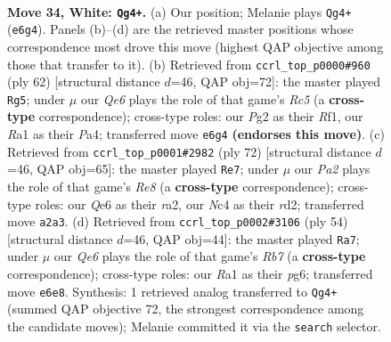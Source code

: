 \documentclass[11pt]{article}
\begin{document}
\clearpage

\begin{figure}[p]\centering
\begin{subfigure}{0.46\textwidth}\centering
\resizebox{\linewidth}{!}{%
\newchessgame
\chessboard[
  setfen={5r2/1r4kp/1p2Q3/p7/2N4P/8/PP3PP1/R5K1 w - - 5 34},
  showmover=false,
  pgfstyle=straightmove, color=movearrow, markmove={e6-g4}
]}
\caption{}
\end{subfigure}\hfill
\begin{subfigure}{0.46\textwidth}\centering
\resizebox{\linewidth}{!}{%
\newchessgame
\chessboard[
  setfen={4r2k/p6p/2N3b1/p1R5/P7/5PK1/3r3P/5R2 w - - 5 32},
  showmover=false,
  pgfstyle=straightmove, color=movearrow, markmove={c5-g5}
]}
\caption{}
\end{subfigure}
\\[4pt]
\begin{subfigure}{0.46\textwidth}\centering
\resizebox{\linewidth}{!}{%
\newchessgame
\chessboard[
  setfen={4R3/5ppk/7p/2n2N2/8/7P/r2r1PP1/5RK1 w - - 7 37},
  showmover=false,
  pgfstyle=straightmove, color=movearrow, markmove={e8-e7}
]}
\caption{}
\end{subfigure}\hfill
\begin{subfigure}{0.46\textwidth}\centering
\resizebox{\linewidth}{!}{%
\newchessgame
\chessboard[
  setfen={3r1k2/1R3p1p/6p1/1N6/1n1P4/p7/P4PPP/6K1 w - - 0 28},
  showmover=false,
  pgfstyle=straightmove, color=movearrow, markmove={b7-a7}
]}
\caption{}
\end{subfigure}
\caption{\textbf{Move 34, White: \texttt{Qg4+}.} (a) Our position; Melanie plays \texttt{Qg4+} (\texttt{e6g4}). Panels (b)--(d) are the retrieved master positions whose correspondence most drove this move (highest QAP objective among those that transfer to it). (b) Retrieved from \texttt{ccrl\_top\_p0000\#960} (ply 62) [structural distance $d$=46, QAP obj=72]: the master played \texttt{Rg5}; under $\mu$ our \emph{Qe6} plays the role of that game's \emph{Rc5} (a \textbf{cross-type} correspondence); cross-type roles: our \emph{P}g2 as their \emph{R}f1, our \emph{R}a1 as their \emph{P}a4; transferred move \texttt{e6g4} \textbf{(endorses this move)}. (c) Retrieved from \texttt{ccrl\_top\_p0001\#2982} (ply 72) [structural distance $d$=46, QAP obj=65]: the master played \texttt{Re7}; under $\mu$ our \emph{Pa2} plays the role of that game's \emph{Re8} (a \textbf{cross-type} correspondence); cross-type roles: our \emph{Q}e6 as their \emph{r}a2, our \emph{N}c4 as their \emph{r}d2; transferred move \texttt{a2a3}. (d) Retrieved from \texttt{ccrl\_top\_p0002\#3106} (ply 54) [structural distance $d$=46, QAP obj=44]: the master played \texttt{Ra7}; under $\mu$ our \emph{Qe6} plays the role of that game's \emph{Rb7} (a \textbf{cross-type} correspondence); cross-type roles: our \emph{R}a1 as their \emph{p}g6; transferred move \texttt{e6e8}. Synthesis: 1 retrieved analog transferred to \texttt{Qg4+} (summed QAP objective 72, the strongest correspondence among the candidate moves); Melanie committed it via the \texttt{search} selector.}
\label{fig:thought-m66}
\end{figure}
\end{document}

